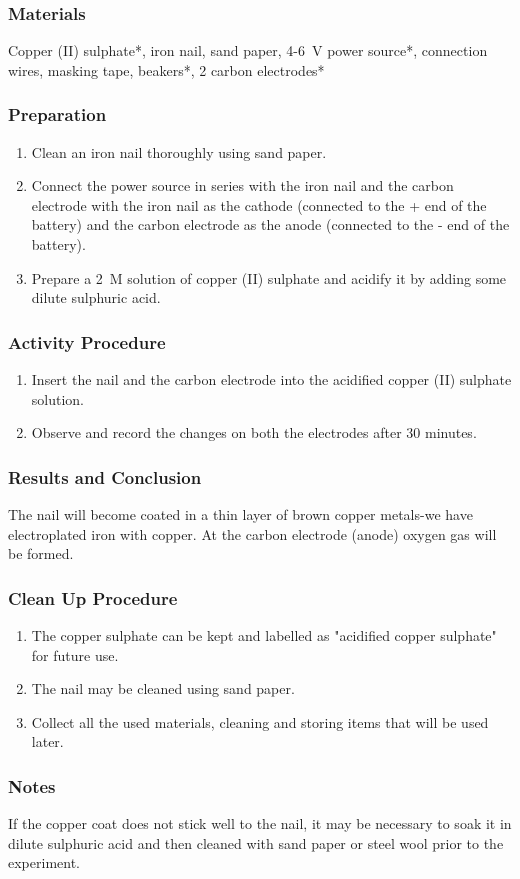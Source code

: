 \subsubsection*{Materials}
Copper (II) sulphate*, iron nail, sand paper, 4-6~V  power source*, connection wires, masking tape, beakers*, 2 carbon electrodes*

\subsubsection*{Preparation}
\begin{enumerate}
\item{Clean an iron nail thoroughly using sand paper.}
\item{Connect the power source in series with the iron nail and the carbon electrode with the iron nail as the cathode (connected to the + end of the battery) and the carbon electrode as the anode (connected to the - end of the battery).}
\item{Prepare a 2~M solution of copper (II) sulphate and acidify it by adding some dilute sulphuric acid.}
\end{enumerate}

\subsubsection*{Activity Procedure}
\begin{enumerate}
\item{Insert the nail and the carbon electrode into the acidified copper (II) sulphate solution.}
\item{Observe and record the changes on both the electrodes after 30 minutes.}
\end{enumerate}

\subsubsection*{Results and Conclusion}
The nail will become coated in a thin layer of brown copper metals-we have electroplated iron with copper. At the carbon electrode (anode) oxygen gas will be formed.

\subsubsection*{Clean Up Procedure}
\begin{enumerate}
\item{The copper sulphate can be kept and labelled as "acidified copper sulphate" for future use.}
\item{The nail may be cleaned using sand paper.}
\item{Collect all the used materials, cleaning and storing items that will be used later.}
\end{enumerate}

\subsubsection*{Notes}
If the copper coat does not stick well to the nail, it may be necessary to soak it in dilute sulphuric acid and then cleaned with sand paper or steel wool prior to the experiment.